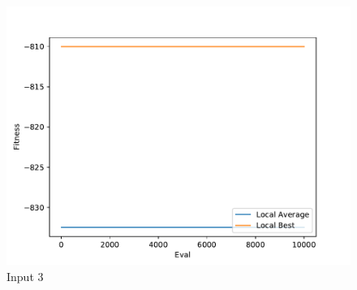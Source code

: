 \documentclass{standalone}
\begin{document}
\begin{figure}[!htb]
	\caption{Input 3}
	\label{fig:graph_3046}
	\includegraphics[width=\textwidth]{../graphs/graphs/3046.pdf}
\end{figure}
\end{document}
